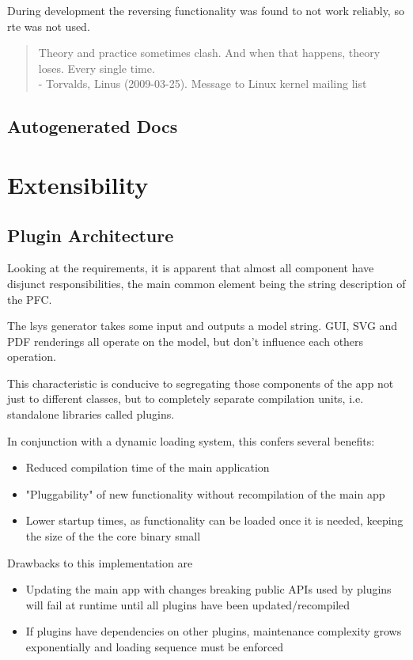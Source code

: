 During development the reversing functionality was found to not work reliably, so \gls{rte} was not used.

\begin{quote}
Theory and practice sometimes clash. And when that happens, theory loses. Every single time.\\
- Torvalds, Linus (2009-03-25). Message to Linux kernel mailing list
\end{quote}

\subsection{Autogenerated Docs}

\section{Extensibility}

\subsection{Plugin Architecture}
Looking at the requirements, it is apparent that almost all component have disjunct responsibilities, the main common element being the string description of the PFC.

The \gls{lsys} generator takes some input and outputs a model string. GUI, SVG and PDF renderings all operate on the model, but don't influence each others operation.

This characteristic is conducive to segregating those components of the app not just to different classes, but to completely separate compilation units, i.e. standalone libraries called plugins.

In conjunction with a dynamic loading system, this confers several benefits:

\begin{itemize}
	\item  Reduced compilation time of the main application
	\item  "Pluggability" of new functionality without recompilation of the main app
	\item  Lower startup times, as functionality can be loaded once it is needed, keeping the size of the the core binary small
\end{itemize}

Drawbacks to this implementation are
\begin{itemize}
	\item Updating the main app with changes breaking public APIs used by plugins will fail at runtime until all plugins have been updated/recompiled
	\item If plugins have dependencies on other plugins, maintenance complexity grows exponentially and loading sequence must be enforced
\end{itemize}

